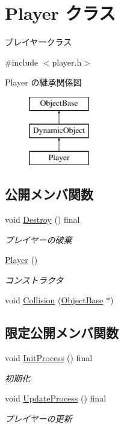 \hypertarget{class_player}{}\section{Player クラス}
\label{class_player}


プレイヤークラス  




{\ttfamily \#include $<$player.\+h$>$}

Player の継承関係図\begin{figure}[H]
\begin{center}
\leavevmode
\includegraphics[height=3.000000cm]{class_player}
\end{center}
\end{figure}
\subsection*{公開メンバ関数}
\begin{DoxyCompactItemize}
\item 
void \mbox{\hyperlink{class_player_af2cf4936165ef12cce96f7994e0879df}{Destroy}} () final
\begin{DoxyCompactList}\small\item\em プレイヤーの破棄 \end{DoxyCompactList}\item 
\mbox{\hyperlink{class_player_affe0cc3cb714f6deb4e62f0c0d3f1fd8}{Player}} ()
\begin{DoxyCompactList}\small\item\em コンストラクタ \end{DoxyCompactList}\item 
void \mbox{\hyperlink{class_player_a660421b69afc7cd6d0d97ea9a28251a2}{Collision}} (\mbox{\hyperlink{class_object_base}{Object\+Base}} $\ast$)
\end{DoxyCompactItemize}
\subsection*{限定公開メンバ関数}
\begin{DoxyCompactItemize}
\item 
void \mbox{\hyperlink{class_player_a1051f85c8bf18a256d275d1a1dee5da6}{Init\+Process}} () final
\begin{DoxyCompactList}\small\item\em 初期化 \end{DoxyCompactList}\item 
void \mbox{\hyperlink{class_player_ab8accc9b83b030f5313f1b4872a7e634}{Update\+Process}} () final
\begin{DoxyCompactList}\small\item\em プレイヤーの更新 \end{DoxyCompactList}\end{DoxyCompactItemize}
